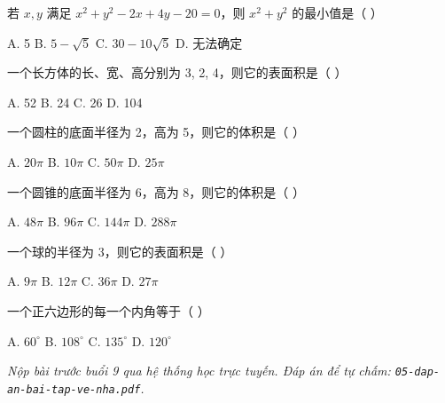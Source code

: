 \documentclass[11pt, a4paper]{article}
\begin{document}
\begin{baitap}[10]
若 $x,y$ 满足 $x^2+y^2-2x+4y-20=0$，则 $x^2+y^2$ 的最小值是（ ）
\par\vspace{3pt}
\noindent A. 5 \quad B. $5-\sqrt{5}$ \quad C. $30-10\sqrt{5}$ \quad D. 无法确定
\end{baitap}

\begin{baitap}[11]
一个长方体的长、宽、高分别为 3, 2, 4，则它的表面积是（ ）
\par\vspace{3pt}
\noindent A. 52 \quad B. 24 \quad C. 26 \quad D. 104
\end{baitap}

\begin{baitap}[12]
一个圆柱的底面半径为 2，高为 5，则它的体积是（ ）
\par\vspace{3pt}
\noindent A. $20\pi$ \quad B. $10\pi$ \quad C. $50\pi$ \quad D. $25\pi$
\end{baitap}

\begin{baitap}[13]
一个圆锥的底面半径为 6，高为 8，则它的体积是（ ）
\par\vspace{3pt}
\noindent A. $48\pi$ \quad B. $96\pi$ \quad C. $144\pi$ \quad D. $288\pi$
\end{baitap}

\begin{baitap}[14]
一个球的半径为 3，则它的表面积是（ ）
\par\vspace{3pt}
\noindent A. $9\pi$ \quad B. $12\pi$ \quad C. $36\pi$ \quad D. $27\pi$
\end{baitap}

\begin{baitap}[15]
一个正六边形的每一个内角等于（ ）
\par\vspace{3pt}
\noindent A. $60^\circ$ \quad B. $108^\circ$ \quad C. $135^\circ$ \quad D. $120^\circ$
\end{baitap}

\vspace{0.3cm}
\noindent\emph{Nộp bài trước buổi 9 qua hệ thống học trực tuyến. Đáp án để tự chấm: \texttt{05-dap-an-bai-tap-ve-nha.pdf}.}
\end{document}

